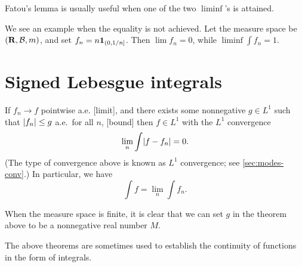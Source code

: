 Fatou's lemma is usually useful when one of the two $\liminf$'s is attained.

We see an example when the equality is not achieved. Let the measure space be $(\mathbf{R},\mathcal{B},m)$, and set $f_n = n \mathbf{1}_{(0,1/n]}$. Then $\lim f_n = 0$, while $\liminf \int f_n = 1$.


\section{Signed Lebesgue integrals}
\begin{namedthm} \label{thm:DCT}
    If $f_n \to f$ pointwise a.e. [limit], and there exists some nonnegative $g \in L^1$ such that $\lvert f_n \rvert \leq g$ a.e.\ for all $n$, [bound]
    then $f \in L^1$ with the $L^1$ convergence \[
        \lim_n \int \lvert f - f_n \rvert = 0.
    \] (The type of convergence above is known as $L^1$ convergence; see \cref{sec:modes-conv}.) In particular, we have \[
        \int f = \lim_n \int f_n.
    \]
    
\end{namedthm}

\begin{namedthm} \label{thm:bdd-conv}
    When the measure space is finite, it is clear that we can set $g$ in the theorem above to be a nonnegative real number $M$.
\end{namedthm}


The above theorems are sometimes used to establish the continuity of functions in the form of integrals.

